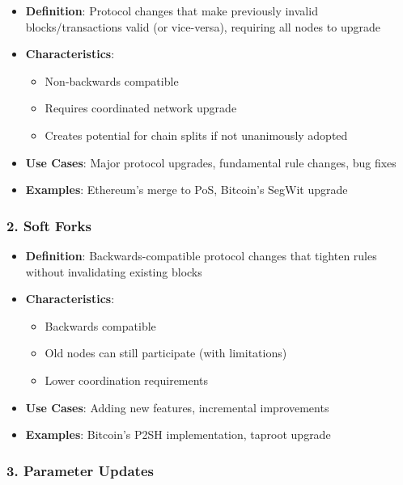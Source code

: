 \documentclass[
  letterpaper,
  DIV=11,
  numbers=noendperiod]{scrreprt}
\providecommand{\tightlist}{%
  \setlength{\itemsep}{0pt}\setlength{\parskip}{0pt}}\usepackage{longtable,booktabs,array}
\begin{document}
\begin{itemize}
\tightlist
\item
  \textbf{Definition}: Protocol changes that make previously invalid
  blocks/transactions valid (or vice-versa), requiring all nodes to
  upgrade
\item
  \textbf{Characteristics}:

  \begin{itemize}
  \tightlist
  \item
    Non-backwards compatible
  \item
    Requires coordinated network upgrade
  \item
    Creates potential for chain splits if not unanimously adopted
  \end{itemize}
\item
  \textbf{Use Cases}: Major protocol upgrades, fundamental rule changes,
  bug fixes
\item
  \textbf{Examples}: Ethereum's merge to PoS, Bitcoin's SegWit upgrade
\end{itemize}

\subsubsection{2. Soft Forks}\label{soft-forks}

\begin{itemize}
\tightlist
\item
  \textbf{Definition}: Backwards-compatible protocol changes that
  tighten rules without invalidating existing blocks
\item
  \textbf{Characteristics}:

  \begin{itemize}
  \tightlist
  \item
    Backwards compatible
  \item
    Old nodes can still participate (with limitations)
  \item
    Lower coordination requirements
  \end{itemize}
\item
  \textbf{Use Cases}: Adding new features, incremental improvements
\item
  \textbf{Examples}: Bitcoin's P2SH implementation, taproot upgrade
\end{itemize}

\subsubsection{3. Parameter Updates}\label{parameter-updates}
\end{document}
